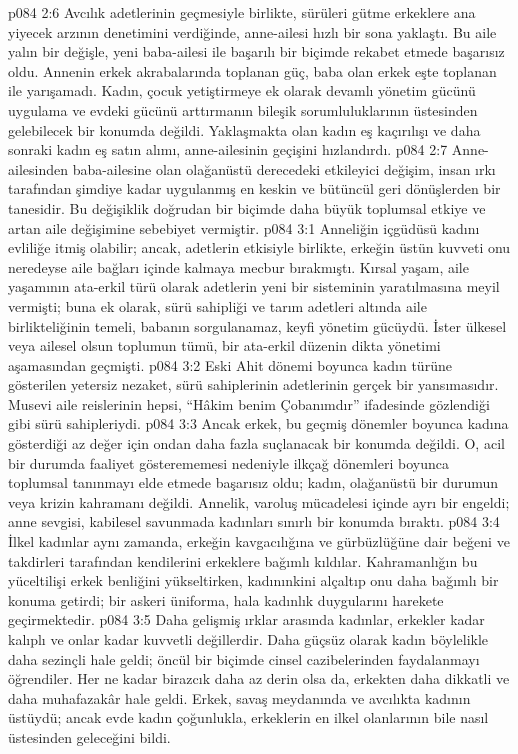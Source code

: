\vs p084 2:6 Avcılık adetlerinin geçmesiyle birlikte, sürüleri gütme erkeklere ana yiyecek arzının denetimini verdiğinde, anne\hyp{}ailesi hızlı bir sona yaklaştı. Bu aile yalın bir değişle, yeni baba\hyp{}ailesi ile başarılı bir biçimde rekabet etmede başarısız oldu. Annenin erkek akrabalarında toplanan güç, baba olan erkek eşte toplanan ile yarışamadı. Kadın, çocuk yetiştirmeye ek olarak devamlı yönetim gücünü uygulama ve evdeki gücünü arttırmanın bileşik sorumluluklarının üstesinden gelebilecek bir konumda değildi. Yaklaşmakta olan kadın eş kaçırılışı ve daha sonraki kadın eş satın alımı, anne\hyp{}ailesinin geçişini hızlandırdı.
\vs p084 2:7 Anne\hyp{}ailesinden baba\hyp{}ailesine olan olağanüstü derecedeki etkileyici değişim, insan ırkı tarafından şimdiye kadar uygulanmış en keskin ve bütüncül geri dönüşlerden bir tanesidir. Bu değişiklik doğrudan bir biçimde daha büyük toplumsal etkiye ve artan aile değişimine sebebiyet vermiştir.
\vs p084 3:1 Anneliğin içgüdüsü kadını evliliğe itmiş olabilir; ancak, adetlerin etkisiyle birlikte, erkeğin üstün kuvveti onu neredeyse aile bağları içinde kalmaya mecbur bırakmıştı. Kırsal yaşam, aile yaşamının ata\hyp{}erkil türü olarak adetlerin yeni bir sisteminin yaratılmasına meyil vermişti; buna ek olarak, sürü sahipliği ve tarım adetleri altında aile birlikteliğinin temeli, babanın sorgulanamaz, keyfi yönetim gücüydü. İster ülkesel veya ailesel olsun toplumun tümü, bir ata\hyp{}erkil düzenin dikta yönetimi aşamasından geçmişti.
\vs p084 3:2 Eski Ahit dönemi boyunca kadın türüne gösterilen yetersiz nezaket, sürü sahiplerinin adetlerinin gerçek bir yansımasıdır. Musevi aile reislerinin hepsi, “Hâkim benim Çobanımdır” ifadesinde gözlendiği gibi sürü sahipleriydi.
\vs p084 3:3 Ancak erkek, bu geçmiş dönemler boyunca kadına gösterdiği az değer için ondan daha fazla suçlanacak bir konumda değildi. O, acil bir durumda faaliyet gösterememesi nedeniyle ilkçağ dönemleri boyunca toplumsal tanınmayı elde etmede başarısız oldu; kadın, olağanüstü bir durumun veya krizin kahramanı değildi. Annelik, varoluş mücadelesi içinde ayrı bir engeldi; anne sevgisi, kabilesel savunmada kadınları sınırlı bir konumda bıraktı.
\vs p084 3:4 İlkel kadınlar aynı zamanda, erkeğin kavgacılığına ve gürbüzlüğüne dair beğeni ve takdirleri tarafından kendilerini erkeklere bağımlı kıldılar. Kahramanlığın bu yüceltilişi erkek benliğini yükseltirken, kadınınkini alçaltıp onu daha bağımlı bir konuma getirdi; bir askeri üniforma, hala kadınlık duygularını harekete geçirmektedir.
\vs p084 3:5 Daha gelişmiş ırklar arasında kadınlar, erkekler kadar kalıplı ve onlar kadar kuvvetli değillerdir. Daha güçsüz olarak kadın böylelikle daha sezinçli hale geldi; öncül bir biçimde cinsel cazibelerinden faydalanmayı öğrendiler. Her ne kadar birazcık daha az derin olsa da, erkekten daha dikkatli ve daha muhafazakâr hale geldi. Erkek, savaş meydanında ve avcılıkta kadının üstüydü; ancak evde kadın çoğunlukla, erkeklerin en ilkel olanlarının bile nasıl üstesinden geleceğini bildi.
